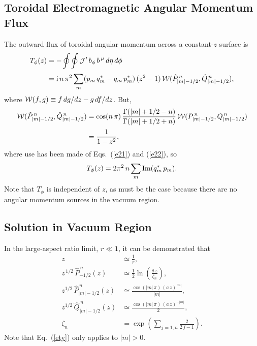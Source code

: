 \documentclass[12pt,prb,aps]{revtex4-1}
\begin{document}
\subsection{Toroidal Electromagnetic Angular Momentum Flux}
The outward flux of toroidal angular momentum across a constant-$z$ surface is
\begin{align}
T_\phi(z) &= -\oint\oint {\cal J}' \,b_\phi\,b^{\,\mu}\,d\eta\,d\phi\\[0.5ex]
&={\rm i}\,n\,\pi^2\sum_{m}(p_m\,q_m^\ast-q_m\,p_m^{\ast})\,(z^2-1)\,{\cal W}(\hat{P}_{|m|-1/2}^{\,n},\hat{Q}_{|m|-1/2}^{\,n}),
\end{align}
where ${\cal W}(f,g)\equiv f\,dg/dz-g\,df/dz$. 
But,\cite{morse}
\begin{align}
{\cal W}(\hat{P}_{|m|-1/2}^{\,n},\hat{Q}_{|m|-1/2}^{\,n})&= 
\cos(n\,\pi) \,\frac{\Gamma(|m|+1/2-n)}{\Gamma(|m|+1/2+n)}\,{\cal W}(P_{|m|-1/2}^{\,n},Q_{|m|-1/2}^{\,n})\nonumber\\[0.5ex]
&= \frac{1}{1-z^2}, 
\end{align}
where use has been made of Eqs.~(\ref{e21}) and (\ref{e22}), 
so
\begin{equation}\label{e30x}
T_\phi(z) = 2\pi^2\,n\sum_m {\rm Im}(q_m^\ast\,p_m).
\end{equation}
Note that $T_\phi$ is independent of $z$, as must be the case because there are no angular momentum sources in the vacuum region.

\subsection{Solution in Vacuum Region}
In the large-aspect ratio limit, $r\ll 1$, it can be demonstrated that\,\cite{morse}
\begin{align}\label{e25t}
z&\simeq \frac{1}{r},\\[0.5ex]
z^{\,1/2}\,\hat{P}^{\,n}_{-1/2}(z) &\simeq \frac{1}{2}\ln\left(\frac{8\,z}{\zeta_n}\right),\\[0.5ex]
z^{1/2}\,\hat{P}^{\,n}_{|m|-1/2}(z) &\simeq \frac{\cos(|m|\,\pi)\,(a\,z)^{|m|}}{|m|},\label{ety}\\[0.5ex]
z^{1/2}\,\hat{Q}^{\,n}_{|m|-1/2}(z) &\simeq \frac{\cos(|m|\,\pi)\,(a\,z)^{-|m|}}{2},\\[0.5ex]
\zeta_n &= \exp\left(\sum_{j=1,n}\frac{2}{2\,j-1}\right).\label{e29t}
\end{align}
Note that Eq.~(\ref{ety}) only applies to $|m|>0$. 
\end{document}
